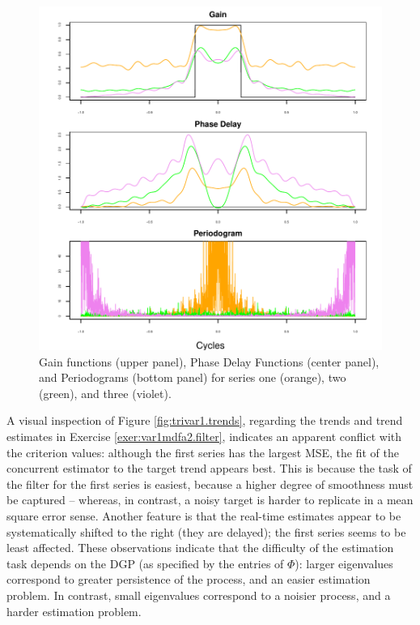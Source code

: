 \documentclass[a4paper]{book}
\begin{document}
\begin{figure}[htb!]
\begin{center}
\includegraphics[]{"mdfa_trivar1_freqdomain.pdf"}
\caption{Gain functions (upper panel), 
	Phase Delay Functions (center panel), and Periodograms (bottom panel)
	 for series one (orange), two (green), and three (violet).}
\label{fig:trivar1.freqdomain}
\end{center}
\end{figure}


A visual inspection of Figure \ref{fig:trivar1.trends}, regarding
the trends and trend estimates in Exercise 
 \ref{exer:var1mdfa2.filter}, indicates an apparent conflict with the 
 criterion values: although the first series has the largest MSE,
 the fit of the concurrent estimator to the target trend appears best.
 This is because the task of the filter for the first series is
 easiest, because a higher degree of smoothness must be captured --
 whereas, in contrast, a noisy target is harder to replicate in a
 mean square error sense. Another feature is that the real-time estimates appear
  to be systematically 
shifted to the right (they are delayed); the first series seems to be least
 affected.   These observations indicate that the difficulty of the estimation 
  task  depends on the DGP (as specified by the entries of $\Phi$):
 larger eigenvalues correspond to greater persistence of the process, 
  and an easier estimation problem.  In contrast, small eigenvalues 
 correspond to a noisier process, and a harder estimation problem.
 
\end{document}
